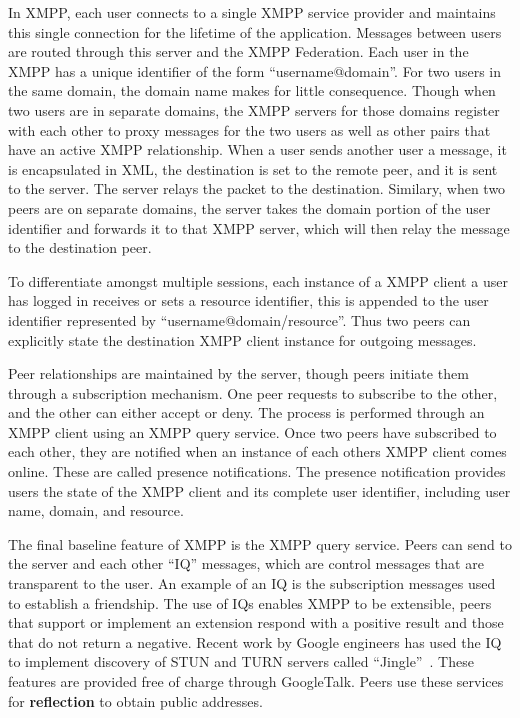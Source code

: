 \documentclass[conference]{IEEEtran}
\begin{document}
In XMPP, each user connects to a single XMPP service provider and maintains
this single connection for the lifetime of the application.  Messages between
users are routed through this server and the XMPP Federation.  Each user in the
XMPP has a unique identifier of the form ``username@domain''.  For two users in
the same domain, the domain name makes for little consequence.  Though when two
users are in separate domains, the XMPP servers for those domains register with
each other to proxy messages for the two users as well as other pairs that have
an active XMPP relationship.  When a user sends another user a message, it is
encapsulated in XML, the destination is set to the remote peer, and it is sent
to the server.  The server relays the packet to the destination.  Similary,
when two peers are on separate domains, the server takes the domain portion of
the user identifier and forwards it to that XMPP server, which will then relay
the message to the destination peer.

To differentiate amongst multiple sessions, each instance of a XMPP client a
user has logged in receives or sets a resource identifier, this is appended to
the user identifier represented by ``username@domain/resource''.  Thus two peers
can explicitly state the destination XMPP client instance for outgoing
messages.

Peer relationships are maintained by the server, though peers initiate them
through a subscription mechanism.  One peer requests to subscribe to the other,
and the other can either accept or deny.  The process is performed through an
XMPP client using an XMPP query service.  Once two peers have subscribed to
each other, they are notified when an instance of each others XMPP client comes
online.  These are called presence notifications.  The presence notification
provides users the state of the XMPP client and its complete user identifier,
including user name, domain, and resource.

The final baseline feature of XMPP is the XMPP query service.  Peers can send
to the server and each other ``IQ'' messages, which are control messages that
are transparent to the user.  An example of an IQ is the subscription messages
used to establish a friendship.  The use of IQs enables XMPP to be extensible,
peers that support or implement an extension respond with a positive result and
those that do not return a negative.  Recent work by Google engineers has used
the IQ to implement discovery of STUN and TURN servers called
``Jingle''~\cite{jingle}.  These features are provided free of charge through
GoogleTalk.  Peers use these services for \textbf{reflection} to obtain public
addresses.
\end{document}
